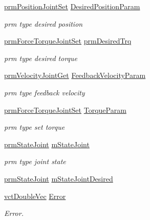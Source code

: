 \begin{DoxyCompactItemize}
\item 
\hyperlink{classprm_position_joint_set}{prm\-Position\-Joint\-Set} \hyperlink{classmts_p_i_d_a7ef37febb5f1248dcccfa6a0e857b7a9}{Desired\-Position\-Param}
\begin{DoxyCompactList}\small\item\em prm type desired position \end{DoxyCompactList}\item 
\hyperlink{classprm_force_torque_joint_set}{prm\-Force\-Torque\-Joint\-Set} \hyperlink{classmts_p_i_d_a6be58279848adac1f3612c320cf182ea}{prm\-Desired\-Trq}
\begin{DoxyCompactList}\small\item\em prm type desired torque \end{DoxyCompactList}\item 
\hyperlink{classprm_velocity_joint_get}{prm\-Velocity\-Joint\-Get} \hyperlink{classmts_p_i_d_aeeab33b51fd3b843ac969d8e15ec0d8a}{Feedback\-Velocity\-Param}
\begin{DoxyCompactList}\small\item\em prm type feedback velocity \end{DoxyCompactList}\item 
\hyperlink{classprm_force_torque_joint_set}{prm\-Force\-Torque\-Joint\-Set} \hyperlink{classmts_p_i_d_a5aab0504bce1d2293bfbbc2eeec3f1f9}{Torque\-Param}
\begin{DoxyCompactList}\small\item\em prm type set torque \end{DoxyCompactList}\item 
\hyperlink{classprm_state_joint}{prm\-State\-Joint} \hyperlink{classmts_p_i_d_a4320e53f7d7107b372ea81ed44b55f8a}{m\-State\-Joint}
\begin{DoxyCompactList}\small\item\em prm type joint state \end{DoxyCompactList}\item 
\hyperlink{classprm_state_joint}{prm\-State\-Joint} \hyperlink{classmts_p_i_d_a524a57a882880a7078a5010a5097a360}{m\-State\-Joint\-Desired}
\item 
\hyperlink{vct_dynamic_vector_types_8h_ade4b3068c86fb88f41af2e5187e491c2}{vct\-Double\-Vec} \hyperlink{classmts_p_i_d_a48747e1fcd6e96164d925b8803105697}{Error}
\begin{DoxyCompactList}\small\item\em Error. \end{DoxyCompactList}\item 

\end{DoxyCompactItemize}
